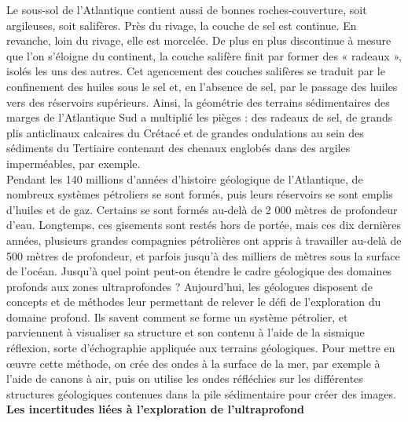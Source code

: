\documentclass[8pt]{article}
\begin{document}
Le sous-sol de l'Atlantique contient aussi de bonnes roches-couverture, soit argileuses, soit salifères. Près du rivage, la couche de sel est continue. En revanche, loin du rivage, elle est morcelée. De plus en plus discontinue à mesure que l'on s'éloigne du continent, la couche salifère finit par former des « radeaux », isolés les uns des autres. Cet agencement des couches salifères se traduit par le confinement des huiles sous le sel et, en l'absence de sel, par le passage des huiles vers des réservoirs supérieurs. Ainsi, la géométrie des terrains sédimentaires des marges de l'Atlantique Sud a multiplié les pièges : des radeaux de sel, de grands plis anticlinaux calcaires du Crétacé et de grandes ondulations au sein des sédiments du Tertiaire contenant des chenaux englobés dans des argiles imperméables, par exemple.\\

Pendant les 140 millions d'années d'histoire géologique de l'Atlantique, de nombreux systèmes pétroliers se sont formés, puis leurs réservoirs se sont emplis d'huiles et de gaz. Certains se sont formés au-delà de 2 000 mètres de profondeur d'eau. Longtemps, ces gisements sont restés hors de portée, mais ces dix dernières années, plusieurs grandes compagnies pétrolières ont appris à travailler au-delà de 500 mètres de profondeur, et parfois jusqu'à des milliers de mètres sous la surface de l'océan. Jusqu'à quel point peut-on étendre le cadre géologique des domaines profonds aux zones ultraprofondes ? Aujourd'hui, les géologues disposent de concepts et de méthodes leur permettant de relever le défi de l'exploration du domaine profond. Ils savent comment se forme un système pétrolier, et parviennent à visualiser sa structure et son contenu à l'aide de la sismique réflexion, sorte d'échographie appliquée aux terrains géologiques. Pour mettre en œuvre cette méthode, on crée des ondes à la surface de la mer, par exemple à l'aide de canons à air, puis on utilise les ondes réfléchies sur les différentes structures géologiques contenues dans la pile sédimentaire pour créer des images.\\

\textbf{Les incertitudes liées à l'exploration de l'ultraprofond}\\
\end{document}
